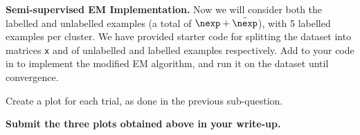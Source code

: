\item{} \textbf{Semi-supervised EM Implementation.}
Now we will consider both the labelled and unlabelled examples (a total of $\nexp + \tilde{\nexp}$), with 5 labelled examples per cluster. We have provided starter code for splitting the dataset into matrices \texttt{x} and  of unlabelled and labelled examples respectively. Add to your code in  to implement the modified EM algorithm, and run it on the dataset until convergence.

Create a plot for each trial, as done in the previous sub-question.

\textbf{Submit the three plots obtained above in your write-up.}

